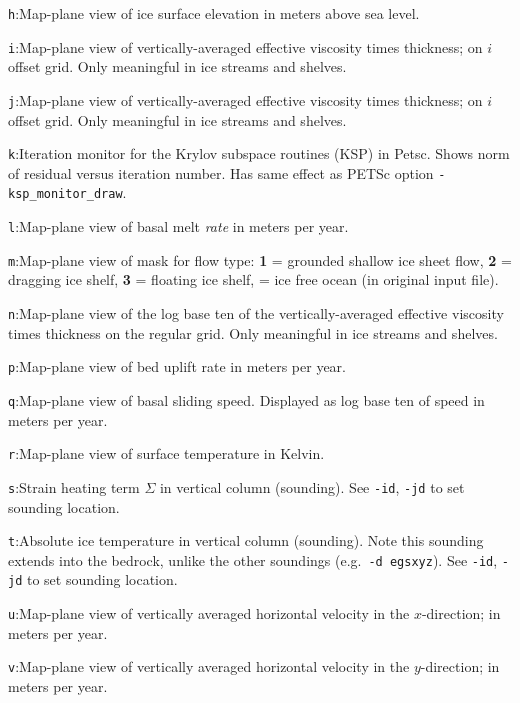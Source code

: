 \documentclass[11pt,final]{amsart}
\begin{document}
\verb|h|:\quad Map-plane view of ice surface elevation in meters above sea level.

\verb|i|:\quad Map-plane view of vertically-averaged effective viscosity times thickness; on $i$ offset grid.  Only meaningful in ice streams and shelves.

\verb|j|:\quad Map-plane view of vertically-averaged effective viscosity times thickness; on $i$ offset grid.  Only meaningful in ice streams and shelves.

\verb|k|:\quad \notMat Iteration monitor for the Krylov subspace routines (KSP) in Petsc.  Shows norm of residual versus iteration number.  Has same effect as PETSc option \verb|-ksp_monitor_draw|.

\verb|l|:\quad Map-plane view of basal melt \emph{rate} in meters per year.

\verb|m|:\quad Map-plane view of mask for flow type:  \textbf{1} = grounded shallow ice sheet flow,  \textbf{2} = dragging ice shelf, \textbf{3} = floating ice shelf,  = ice free ocean (in original input file).


\verb|n|:\quad Map-plane view of the log base ten of the vertically-averaged effective viscosity times thickness on the regular grid.  Only meaningful in ice streams and shelves.

\verb|p|:\quad Map-plane view of bed uplift rate in meters per year.

\verb|q|:\quad Map-plane view of basal sliding speed.  Displayed as log base ten of speed in meters per year.

\verb|r|:\quad Map-plane view of surface temperature in Kelvin.

\verb|s|:\quad Strain heating term $\Sigma$ in vertical column (sounding).  See \verb|-id|, \verb|-jd| to set sounding location.

\verb|t|:\quad Absolute ice temperature in vertical column (sounding).  Note this sounding extends into the bedrock, unlike the other soundings (e.g.~\verb|-d egsxyz|).  See \verb|-id|, \verb|-jd| to set sounding location.

\verb|u|:\quad Map-plane view of vertically averaged horizontal velocity in the $x$-direction;  in meters per year.

\verb|v|:\quad Map-plane view of vertically averaged horizontal velocity in the $y$-direction;  in meters per year.
\end{document}
